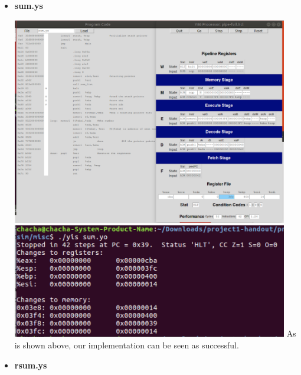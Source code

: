 \documentclass{article}
\begin{document}
\begin{itemize}
\item \textbf{sum.ys}

\includegraphics[width=0.95\textwidth]{A-sum.png}
\includegraphics[width=0.95\textwidth]{sum.png}
As is shown above, our implementation can be seen as successful.

\item \textbf{rsum.ys}


\end{itemize}
\end{document}
